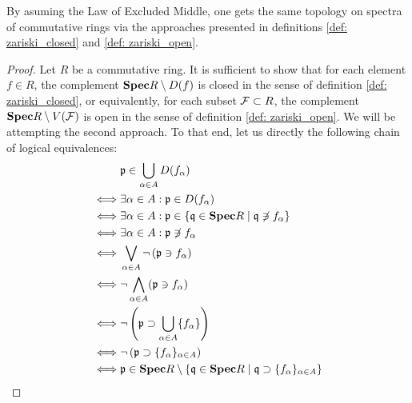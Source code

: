                 \begin{proposition} \label{prop: zariski_topology_equivalence}
                    By asuming the Law of Excluded Middle, one gets the same topology on spectra of commutative rings via the approaches presented in definitions \ref{def: zariski_closed} and \ref{def: zariski_open}.
                \end{proposition}
                    \begin{proof}
                        Let $R$ be a commutative ring. It is sufficient to show that for each element $f \in R$, the complement $\Spec R \setminus D(f)$ is closed in the sense of definition \ref{def: zariski_closed}, or equivalently, for each subset $\calF \subset R$, the complement $\Spec R \setminus V(\calF)$ is open in the sense of definition \ref{def: zariski_open}. We will be attempting the second approach. To that end, let us directly the following chain of logical equivalences:
                            $$
                                \begin{aligned}
                                    & \p \in \bigcup_{\alpha \in A} D(f_{\alpha})
                                    \\
                                    \iff & \exists \alpha \in A: \p \in D(f_{\alpha})
                                    \\
                                    \iff & \exists \alpha \in A: \p \in \{\q \in \Spec R \mid \q \not \ni f_{\alpha}\}
                                    \\
                                    \iff & \exists \alpha \in A: \p \not \ni f_{\alpha}
                                    \\
                                    \iff & \bigvee_{\alpha \in A} \neg\left(\p \ni f_{\alpha}\right)
                                    \\
                                    \iff & \neg \bigwedge_{\alpha \in A} (\p \ni f_{\alpha}) 
                                    \\
                                    \iff & \neg \left(\p \supset \bigcup_{\alpha \in A} \{f_{\alpha}\}\right)
                                    \\
                                    \iff & \neg \left(\p \supset \{f_{\alpha}\}_{\alpha \in A}\right)
                                    \\
                                    \iff & \p \in \Spec R \setminus \left\{\q \in \Spec R \mid \q \supset \{f_{\alpha}\}_{\alpha \in A}\right\}

\end{aligned}$$
\end{proof}
